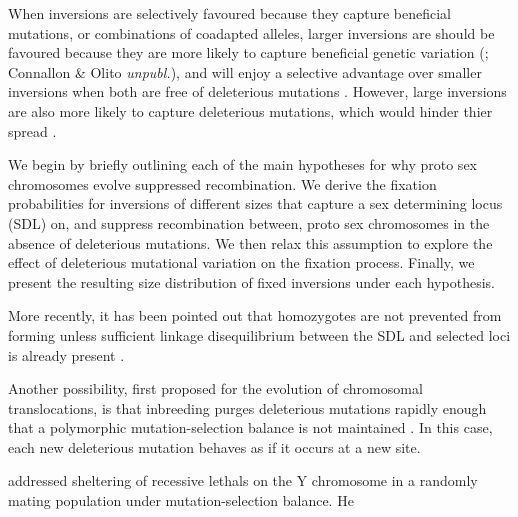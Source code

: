 \documentclass{article}
\newcommand\hl[1]{%
  \bgroup
  \hskip0pt\color{blue!80!black}%
  #1%
  \egroup
}
\begin{document}
When inversions are selectively favoured because they capture beneficial mutations, or combinations of coadapted alleles, larger inversions are should be favoured because they are more likely to capture beneficial genetic variation (\citealt{Nei1967, vanValenLevins1968, ChengKirkpatrick2019}; Connallon \& Olito {\itshape unpubl.}), and will enjoy a selective advantage over smaller inversions when both are free of deleterious mutations \citep{Nei1967}. However, large inversions are also more likely to capture deleterious mutations, which would hinder thier spread \citep{Nei1967}. 


We begin by briefly outlining each of the main hypotheses for why proto sex chromosomes evolve suppressed recombination. We derive the fixation probabilities for inversions of different sizes that capture a sex determining locus (SDL) on, and suppress recombination between, proto sex chromosomes in the absence of deleterious mutations. We then relax this assumption to explore the effect of deleterious mutational variation on the fixation process. Finally, we present the resulting size distribution of fixed inversions under each hypothesis.






More recently, it has been pointed out that homozygotes are not prevented from forming unless sufficient linkage disequilibrium between the SDL and selected loci is already present \citep{Branco2017, Charlesworth2017}.

Another possibility, first proposed for the evolution of chromosomal translocations, is that inbreeding purges deleterious mutations rapidly enough that a polymorphic mutation-selection balance is not maintained \citep{}. In this case, each new deleterious mutation behaves as if it occurs at a new site. 

addressed sheltering of recessive lethals on the Y chromosome in a randomly mating population under mutation-selection balance. He
\end{document}
